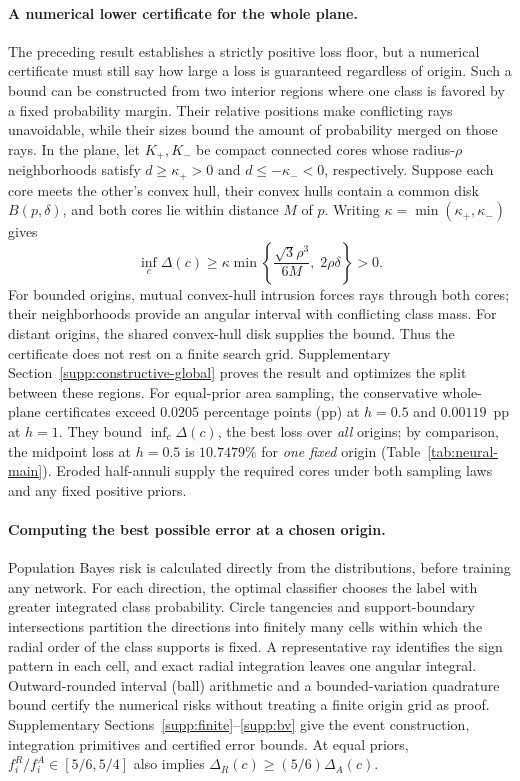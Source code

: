 \paragraph{A numerical lower certificate for the whole plane.}
The preceding result establishes a strictly positive loss floor, but a numerical certificate must still say how large a loss is guaranteed regardless of origin. Such a bound can be constructed from two interior regions where one class is favored by a fixed probability margin. Their relative positions make conflicting rays unavoidable, while their sizes bound the amount of probability merged on those rays. In the plane, let $K_+,K_-$ be compact connected cores whose radius-$\rho$ neighborhoods satisfy $d\geq\kappa_+>0$ and $d\leq-\kappa_-<0$, respectively. Suppose each core meets the other's convex hull, their convex hulls contain a common disk $B(p,\delta)$, and both cores lie within distance $M$ of $p$. Writing $\kappa=\min(\kappa_+,\kappa_-)$ gives
\begin{equation}
 \inf_c\Delta(c)\geq\kappa\min\left\{
 \frac{\sqrt3\rho^3}{6M},\;2\rho\delta\right\}>0.
 \label{eq:constructive-global}
\end{equation}
For bounded origins, mutual convex-hull intrusion forces rays through both cores; their neighborhoods provide an angular interval with conflicting class mass. For distant origins, the shared convex-hull disk supplies the bound. Thus the certificate does not rest on a finite search grid. Supplementary Section~\ref{supp:constructive-global} proves the result and optimizes the split between these regions. For equal-prior area sampling, the conservative whole-plane certificates exceed $0.0205$ percentage points (pp) at $h=0.5$ and $0.00119$~pp at $h=1$. They bound $\inf_c\Delta(c)$, the best loss over \emph{all} origins; by comparison, the midpoint loss at $h=0.5$ is $10.7479\%$ for \emph{one fixed} origin (Table~\ref{tab:neural-main}). Eroded half-annuli supply the required cores under both sampling laws and any fixed positive priors.

\paragraph{Computing the best possible error at a chosen origin.}
Population Bayes risk is calculated directly from the distributions, before training any network. For each direction, the optimal classifier chooses the label with greater integrated class probability. Circle tangencies and support-boundary intersections partition the directions into finitely many cells within which the radial order of the class supports is fixed. A representative ray identifies the sign pattern in each cell, and exact radial integration leaves one angular integral. Outward-rounded interval (ball) arithmetic and a bounded-variation quadrature bound certify the numerical risks without treating a finite origin grid as proof. Supplementary Sections~\ref{supp:finite}--\ref{supp:bv} give the event construction, integration primitives and certified error bounds. At equal priors, $f_i^R/f_i^A\in[5/6,5/4]$ also implies $\Delta_R(c)\geq(5/6)\Delta_A(c)$.

